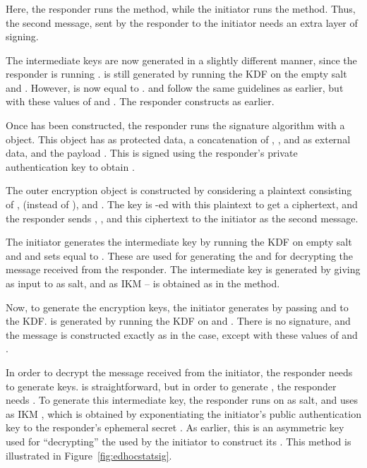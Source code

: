 \subsubsection{\mStatSig}
Here, the responder runs the \mSig{} method, while the initiator runs the \mStat{} method. Thus, the second message, sent by the responder to the initiator needs an extra layer of signing. 

The intermediate keys are now generated in a slightly different manner, since
the responder is running \mSig. \mPRKtwo{} is still generated by running the KDF
on the empty salt and \mGxy. However, \mPRKthree{} is now equal to \mPRKtwo.
\mKtwom{} and \mKtwoe{} follow the same guidelines as earlier, but with these
values of \mPRKtwo{} and \mPRKthree. The responder constructs \mMactwo{} as earlier.

Once \mMactwo{} has been constructed, the responder runs the signature algorithm
with a \mCose{} object. This object has \mIdcredr{} as protected data, a
concatenation of \mTHtwo, \mCredr, and \mADtwo{} as external data, and the payload \mMactwo. This is signed using the responder's private authentication key to obtain \mSigtwo.

The outer encryption object is constructed by considering a plaintext consisting
of \mCredr, \mSigtwo{} (instead of \mMactwo), and \mADtwo. The key \mKtwoae{} is \mXor-ed with this plaintext to get a ciphertext, and the responder sends \mGy, \mCr, and this ciphertext to the initiator as the second message.

The initiator generates the intermediate key \mPRKtwo by running the KDF on
empty salt and \mGxy{} and sets \mPRKthree{} equal to \mPRKtwo. These are used
for generating the \mKtwom{} and \mKtwoe{} for decrypting the message received
from the responder. The intermediate key \mPRKfour{} is generated by giving as
input to \mHkdfExtract{} \mPRKthree{} as salt, and \mGiy{} as IKM -- \mGiy{} is
obtained as in the \mStatStat{} method.

Now, to generate the encryption keys, the initiator generates \mKthreem{} by
passing \mPRKfour{} and \mTHthree{} to the KDF. \mKthreeae{} is generated by
running the KDF on \mPRKthree{} and \mTHthree. There is no signature, and the
message is constructed exactly as in the \mStatStat{} case, except with these
values of \mKthreem{} and \mKthreeae.

In order to decrypt the message received from the initiator, the responder needs
to generate keys. \mKthreeae{} is straightforward, but in order to generate
\mKthreem, the responder needs \mPRKfour. To generate this intermediate key, the
responder runs \mHkdfExtract{} on \mPRKthree{} as salt, and uses as IKM \mGiy,
which is obtained by exponentiating the initiator's public authentication key to
the responder's ephemeral secret \mGy. As earlier, this is an asymmetric key
used for ``decrypting'' the \mGiy{} used by the initiator to construct its \mPRKfour. This method is illustrated in Figure~\ref{fig:edhocstatsig}.

